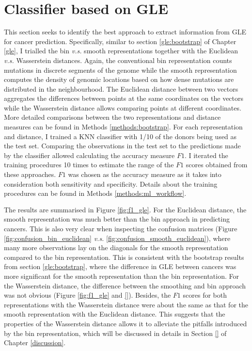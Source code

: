 \section{Classifier based on GLE}\label{ml:gle}
This section seeks to identify the best approach to extract information from GLE for cancer prediction. Specifically, similar to section \ref{gle:bootstrap} of Chapter \ref{gle}, I trialled the bin \textit{v.s.} smooth representations together with the Euclidean \textit{v.s.} Wasserstein distances. Again, the conventional bin representation counts mutations in discrete segments of the genome while the smooth representation computes the density of genomic locations based on how dense mutations are distributed in the neighbourhood. The Euclidean distance between two vectors aggregates the differences between points at the same coordinates on the vectors while the Wasserstein distance allows comparing points at different coordinates. More detailed comparisons between the two representations and distance measures can be found in Methods \ref{methods:bootstrap}. For each representation and distance, I trained a KNN classifier with 1/10 of the donors being used as the test set. Comparing the observations in the test set to the predictions made by the classifier allowed calculating the accuracy measure $F1$. I iterated the training procedures 10 times to estimate the range of the $F1$ scores obtained from these approaches. $F1$ was chosen as the accuracy measure as it takes into consideration both sensitivity and specificity. Details about the training procedures can be found in Methods \ref{methods:ml_workflow}.

The results are summarised in Figure \ref{fig:f1_gle}. For the Euclidean distance, the smooth representation was much better than the bin approach in predicting cancers. This is also very clear when inspecting the confusion matrices (Figure \ref{fig:confusion_bin_euclidean} \textit{v.s.} \ref{fig:confusion_smooth_euclidean}), where many more observations lay on the diagonals for the smooth representation compared to the bin representation. This is consistent with the bootstrap results from section \ref{gle:bootstrap}, where the difference in GLE between cancers was more significant for the smooth representation than the bin representation. For the Wasserstein distance, the difference between the smoothing and bin approach was not obvious (Figure \ref{fig:f1_gle} and \ref{}). Besides, the $F1$ scores for both representations with the Wasserstein distance were about the same as that for the smooth representation with the Euclidean distance. This suggests that the properties of the Wasserstein distance allows it to alleviate the pitfalls introduced by the bin representation, which will be discussed in details in Section \ref{} of Chapter \ref{discussion}. 

